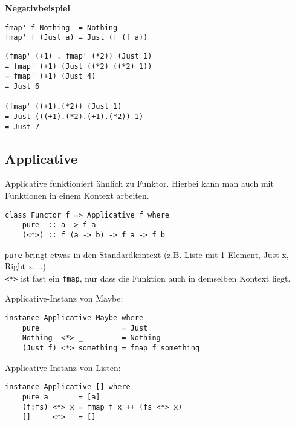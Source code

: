 \documentclass{beamer}
\begin{document}
\begin{frame}[fragile]
\begin{important}\begin{center}\textbf{Negativbeispiel}\end{center}\end{important}
\begin{verbatim}
fmap' f Nothing  = Nothing
fmap' f (Just a) = Just (f (f a))
\end{verbatim}
\pause
\begin{verbatim}
(fmap' (+1) . fmap' (*2)) (Just 1)
= fmap' (+1) (Just ((*2) ((*2) 1))
= fmap' (+1) (Just 4)
= Just 6

(fmap' ((+1).(*2)) (Just 1) 
= Just (((+1).(*2).(+1).(*2)) 1)
= Just 7
\end{verbatim}

\end{frame}


\subsection{Applicative}
\begin{frame}[fragile]
Applicative funktioniert ähnlich zu Funktor. Hierbei kann man auch mit Funktionen in einem Kontext arbeiten.\\
\pause
\begin{verbatim}
class Functor f => Applicative f where
    pure  :: a -> f a
    (<*>) :: f (a -> b) -> f a -> f b
\end{verbatim}
\pause
\texttt{pure} bringt etwas in den Standardkontext (z.B. Liste mit 1 Element, Just x, Right x, ..).\\
\texttt{<*>} ist fast ein \texttt{fmap}, nur dass die Funktion auch in demselben Kontext liegt.
\end{frame}

\begin{frame}[fragile]
Applicative-Instanz von Maybe:
\begin{verbatim}
instance Applicative Maybe where
    pure                   = Just
    Nothing  <*> _         = Nothing
    (Just f) <*> something = fmap f something
\end{verbatim}
\begin{comment}
\pause
Applicative-Instanz von Either:
\begin{verbatim}
instance Applicative Either where
    pure                    = Right
    (Right f) <*> something = fmap f something
    (Left e)  <*> _         = Left e
\end{verbatim}
\end{comment}
\pause
Applicative-Instanz von Listen:
\begin{verbatim}
instance Applicative [] where
    pure a       = [a]
    (f:fs) <*> x = fmap f x ++ (fs <*> x)
    []     <*> _ = []
\end{verbatim}
\end{frame}
\end{document}
